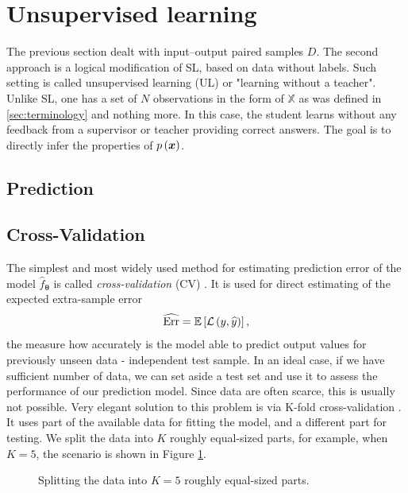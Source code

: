\section{Unsupervised learning}
The previous section dealt with input--output paired samples $D$. The second approach is a logical modification of SL, based on data without labels. Such setting is called unsupervised learning (UL) or "learning without a teacher". Unlike SL, one has a set of $N$ observations in the form of $\mathbb{X}$ as was defined in \ref{sec:terminology} and nothing more. In this case, the student learns without any feedback from a supervisor or teacher providing correct answers. The goal is to directly infer the properties of $p\left( \boldsymbol{x} \right)$.
\subsection{Prediction}

\subsection{Cross-Validation}
The simplest and most widely used method for estimating prediction error of  the model $\hat{f}_{\boldsymbol{\theta}}$ is called \emph{cross-validation} (CV) \cite{statistics}. It is used for direct estimating of the expected extra-sample error
\begin{equation}
	\widehat{\mathrm{Err}} = \mathbb{E}\left[\mathcal{L}\left(y, \widehat{y}\right)\right],
\end{equation}
the measure how accurately is the model able to predict output values for previously unseen data - independent test sample. In an ideal case, if we have sufficient number of data, we can set aside a test set and use
it to assess the performance of our prediction model. Since data are often
scarce, this is usually not possible. Very elegant solution to this problem is via K-fold cross-validation \cite{statistics}. It
uses part of the available data for fitting the model, and a different
part for testing. We split the data into $K$ roughly equal-sized parts, for
example, when $K = 5$, the scenario is shown in Figure \ref{fig:KFOLD}. 
\begin{figure}[h]
\begin{center}
\end{center}
\caption{Splitting the data into $K=5$ roughly equal-sized parts.}
\label{fig:KFOLD}
\end{figure}

